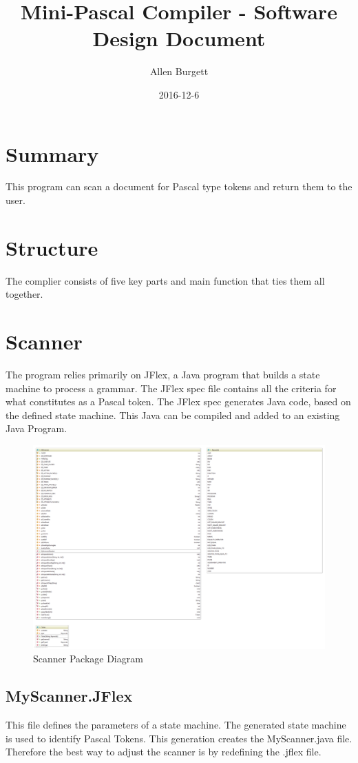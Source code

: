 \documentclass{article}
\title{Mini-Pascal Compiler - Software Design Document}
\date{2016-12-6}
\author{Allen Burgett}
\begin{document}
\maketitle
\pagebreak


\section{Summary}
This program can scan a document for Pascal type tokens and return them to the user.

\section{Structure}
The complier consists of five key parts and main function that ties them all together. 

\section{Scanner}
The program relies primarily on JFlex, a Java program that builds a state machine to process a grammar. The JFlex spec file contains all the criteria for what constitutes as a Pascal token. The JFlex spec generates Java code, based on the defined state machine. This Java can be compiled and added to an existing Java Program.

\begin{figure}[H]
	\includegraphics[width=\linewidth]{scanner.png}
	\caption{Scanner Package Diagram}
\end{figure}

\subsection{MyScanner.JFlex}
This file defines the parameters of a state machine. The generated state machine is used to identify Pascal Tokens. This generation creates the MyScanner.java file. Therefore the best way to adjust the scanner is by redefining the .jflex file.
\end{document}

